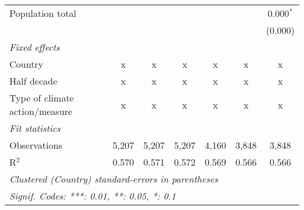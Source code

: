 \begin{tabular}{lcccccc}
   Population total                                                     &         &              &                &                &                & 0.000$^{*}$\\   
                                                                        &         &              &                &                &                & (0.000)\\   
   \emph{Fixed effects}\\
   Country                                                              & x       & x            & x              & x              & x              & x\\  
   Half decade                                                          & x       & x            & x              & x              & x              & x\\  
   Type of climate action/measure                                       & x       & x            & x              & x              & x              & x\\  
   \midrule \emph{Fit statistics}\\
   Observations                                                         & 5,207   & 5,207        & 5,207          & 4,160          & 3,848          & 3,848\\  
   R$^2$                                                                & 0.570   & 0.571        & 0.572          & 0.569          & 0.566          & 0.566\\  
   \midrule
   \multicolumn{7}{l}{\emph{Clustered (Country) standard-errors in parentheses}}\\
   \multicolumn{7}{l}{\emph{Signif. Codes: ***: 0.01, **: 0.05, *: 0.1}}\\
\end{tabular}
\par\endgroup



